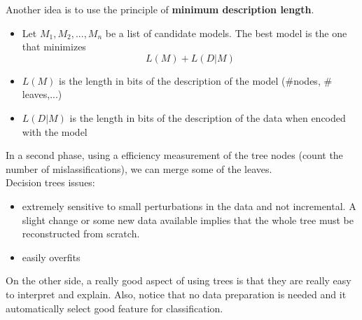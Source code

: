 Another idea is to use the principle of \textbf{minimum description length}.
\begin{itemize}
	\item Let $M_1, M_2, ..., M_n$ be a list of candidate models. The best model is the one that minimizes
	$$ L(M) + L(D | M) $$

	\item $L(M)$ is the length in bits of the description of the model ($\#$nodes, $\#$leaves,...)
	\item $L(D|M)$ is the length in bits of the description of the data when encoded with the model
\end{itemize}

In a second phase, using a efficiency measurement of the tree nodes (count the number of mislassifications), we can merge some of the leaves. \\
Decision trees issues:
\begin{itemize}
	\item extremely sensitive to small perturbations in the data and not incremental. A slight change or some new data available implies that the whole tree must be reconstructed from scratch.
	\item easily overfits
\end{itemize}

On the other side, a really good aspect of using trees is that they are really easy to interpret and explain. Also, notice that no data preparation is needed and it automatically select good feature for classification.
